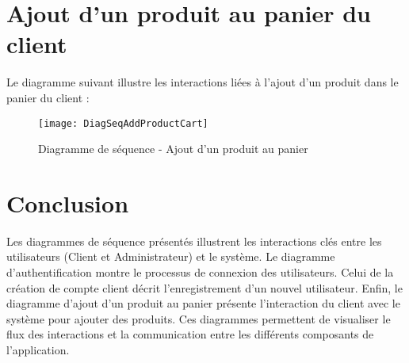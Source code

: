 \section*{Ajout d'un produit au panier du client}
Le diagramme suivant illustre les interactions liées à l'ajout d'un produit dans le panier du client :  
\begin{figure}[H]
    \centering
    \texttt{[image: DiagSeqAddProductCart]}
    \caption{Diagramme de séquence - Ajout d'un produit au panier}
    \label{fig:seq_addtocart}
\end{figure}


\section*{Conclusion}

Les diagrammes de séquence présentés illustrent les interactions clés entre les utilisateurs (Client et Administrateur) et le système. Le diagramme d'authentification montre le processus de connexion des utilisateurs. Celui de la création de compte client décrit l'enregistrement d'un nouvel utilisateur. Enfin, le diagramme d'ajout d'un produit au panier présente l'interaction du client avec le système pour ajouter des produits. Ces diagrammes permettent de visualiser le flux des interactions et la communication entre les différents composants de l'application.

